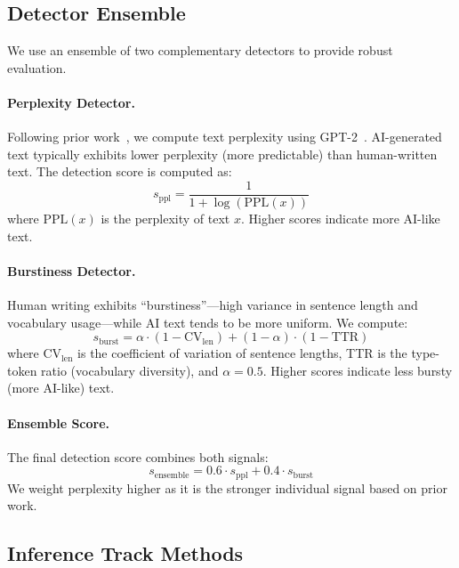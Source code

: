 \subsection{Detector Ensemble}

We use an ensemble of two complementary detectors to provide robust evaluation.

\paragraph{Perplexity Detector.} Following prior work~\citep{mitchell2023detectgpt, gehrmann2019gltr}, we compute text perplexity using GPT-2~\citep{openai2019gpt2}. AI-generated text typically exhibits lower perplexity (more predictable) than human-written text. The detection score is computed as:
\begin{equation}
    s_{\text{ppl}} = \frac{1}{1 + \log(\text{PPL}(x))}
\end{equation}
where $\text{PPL}(x)$ is the perplexity of text $x$. Higher scores indicate more AI-like text.

\paragraph{Burstiness Detector.} Human writing exhibits ``burstiness''---high variance in sentence length and vocabulary usage---while AI text tends to be more uniform. We compute:
\begin{equation}
    s_{\text{burst}} = \alpha \cdot (1 - \text{CV}_{\text{len}}) + (1-\alpha) \cdot (1 - \text{TTR})
\end{equation}
where $\text{CV}_{\text{len}}$ is the coefficient of variation of sentence lengths, TTR is the type-token ratio (vocabulary diversity), and $\alpha = 0.5$. Higher scores indicate less bursty (more AI-like) text.

\paragraph{Ensemble Score.} The final detection score combines both signals:
\begin{equation}
    s_{\text{ensemble}} = 0.6 \cdot s_{\text{ppl}} + 0.4 \cdot s_{\text{burst}}
\end{equation}
We weight perplexity higher as it is the stronger individual signal based on prior work.

\subsection{Inference Track Methods}

